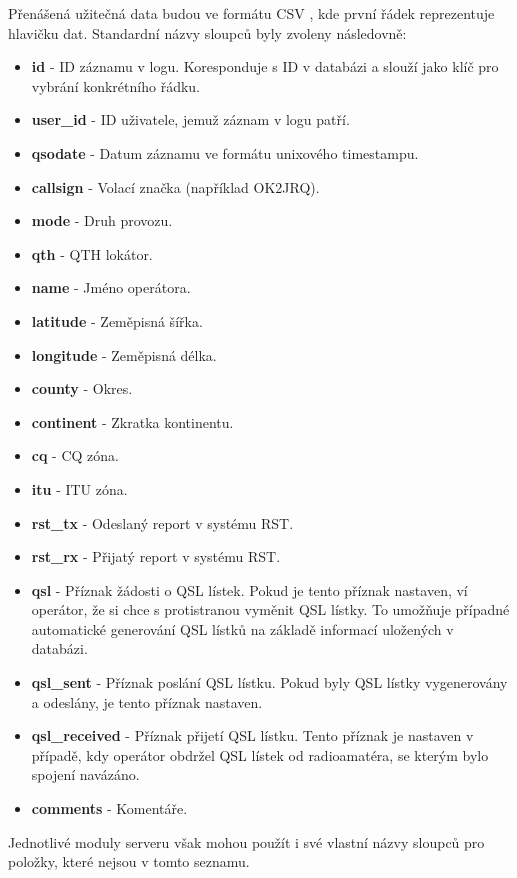 Přenášená užitečná data budou ve formátu CSV \cite{csv}, kde první řádek reprezentuje hlavičku dat. Standardní názvy
sloupců byly zvoleny následovně: %
\begin{itemize}
\item \textbf{id} - ID záznamu v logu. Koresponduje s ID v databázi a slouží jako klíč pro vybrání konkrétního řádku.
\item \textbf{user\_id} - ID uživatele, jemuž záznam v logu patří.
\item \textbf{qsodate} - Datum záznamu ve formátu unixového timestampu.
\item \textbf{callsign} - Volací značka (například OK2JRQ).
\item \textbf{mode} - Druh provozu. %
\item \textbf{qth} - QTH lokátor.
\item \textbf{name} - Jméno operátora.
\item \textbf{latitude} - Zeměpisná šířka.
\item \textbf{longitude} - Zeměpisná délka.
\item \textbf{county} - Okres.
\item \textbf{continent} - Zkratka kontinentu.
\item \textbf{cq} - CQ zóna.
\item \textbf{itu} - ITU zóna.
\item \textbf{rst\_tx} - Odeslaný report v systému RST.
\item \textbf{rst\_rx} - Přijatý report v systému RST.
\item \textbf{qsl} - Příznak žádosti o QSL lístek. Pokud je tento příznak nastaven, ví operátor, že si chce
s protistranou vyměnit QSL lístky. To umožňuje případné automatické generování QSL lístků na základě informací
uložených v databázi.
\item \textbf{qsl\_sent} - Příznak poslání QSL lístku. Pokud byly QSL lístky vygenerovány a odeslány, je tento
příznak nastaven.
\item \textbf{qsl\_received} - Příznak přijetí QSL lístku. Tento příznak je nastaven v případě, kdy operátor
obdržel QSL lístek od radioamatéra, se kterým bylo spojení navázáno.
\item \textbf{comments} - Komentáře.
\end{itemize}

Jednotlivé moduly serveru však mohou použít i své vlastní názvy sloupců pro položky, které nejsou v tomto seznamu.


